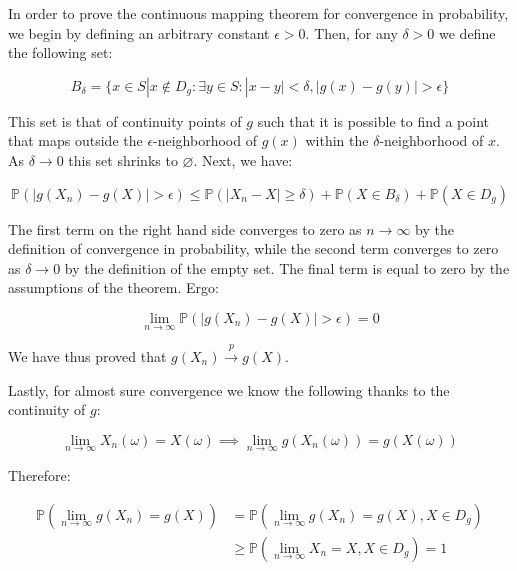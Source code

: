 \documentclass{report}
\begin{document}
In order to prove the continuous mapping theorem for convergence in probability, we begin by defining an arbitrary constant $\epsilon > 0$. Then, for any $\delta > 0$ we define the following set:

\begin{equation}\label{eq:ex-lst-cmt-prob-proof-1}
    B_\delta = \{x \in S | x \notin D_g : \exists y \in S : |x - y| < \delta, |g(x) - g(y)| > \epsilon \} 
\end{equation}

This set is that of continuity points of $g$ such that it is possible to find a point that maps outside the $\epsilon$-neighborhood of $g(x)$ within the $\delta$-neighborhood of $x$. As $\delta \to 0$ this set shrinks to $\varnothing$. Next, we have:

\begin{equation}\label{eq:ex-lst-cmt-prob-proof-2}
    \mathbb{P}(|g(X_n) - g(X)| > \epsilon) \leq \mathbb{P}(|X_n - X| \geq \delta) + \mathbb{P}(X \in B_\delta) + \mathbb{P}(X \in D_g)
\end{equation}

The first term on the right hand side converges to zero as $n \to \infty$ by the definition of convergence in probability, while the second term converges to zero as $\delta \to 0$ by the definition of the empty set. The final term is equal to zero by the assumptions of the theorem. Ergo:

\begin{equation}\label{eq:ex-lst-cmt-prob-proof-3}
    \lim_{n \to \infty} \mathbb{P}(|g(X_n) - g(X)| > \epsilon) = 0
\end{equation}

We have thus proved that $g(X_n) \overset{p}{\to} g(X)$. 

Lastly, for almost sure convergence we know the following thanks to the continuity of $g$:

\begin{equation}\label{eq:ex-lst-cmt-as-proof-1}
    \lim_{n\to\infty} X_n(\omega) = X(\omega) \implies \lim_{n\to\infty} g(X_n(\omega)) = g(X(\omega))
\end{equation}

Therefore:

\begin{equation}\label{eq:ex-lst-cmt-as-proof-2}
    \begin{aligned}
        \mathbb{P}\left(\lim_{n\to\infty} g(X_n) = g(X)\right)
          &= \mathbb{P}\left(\lim_{n\to\infty} g(X_n) = g(X), X \in D_g\right) \\
          &\geq \mathbb{P}\left(\lim_{n\to\infty} X_n = X, X \in D_g\right) = 1 \\
    \end{aligned}
\end{equation}
\end{document}
